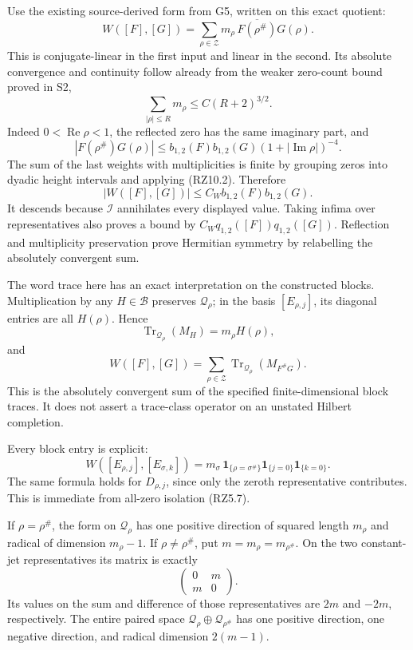 \documentclass[
]{article}
\begin{document}
Use the existing source-derived form from G5, written on this exact
quotient: \[
W([F],[G])
=\sum_{\rho\in\mathscr Z}m_\rho\,
\overline{F(\rho^\#)}G(\rho).
\tag{RZ10.1}
\] This is conjugate-linear in the first input and linear in the second.
Its absolute convergence and continuity follow already from the weaker
zero-count bound proved in S2, \[
\sum_{|\rho|\leq R}m_\rho\leq C(R+2)^{3/2}.
\tag{RZ10.2}
\] Indeed \(0<\operatorname{Re}\rho<1\), the reflected zero has the same
imaginary part, and \[
|F(\rho^\#)G(\rho)|
\leq b_{1,2}(F)b_{1,2}(G)(1+|\operatorname{Im}\rho|)^{-4}.
\] The sum of the last weights with multiplicities is finite by grouping
zeros into dyadic height intervals and applying (RZ10.2). Therefore \[
|W([F],[G])|
\leq C_W b_{1,2}(F)b_{1,2}(G).
\tag{RZ10.3}
\] It descends because \(\mathcal I\) annihilates every displayed value.
Taking infima over representatives also proves a bound by
\(C_Wq_{1,2}([F])q_{1,2}([G])\). Reflection and multiplicity
preservation prove Hermitian symmetry by relabelling the absolutely
convergent sum.

The word trace here has an exact interpretation on the constructed
blocks. Multiplication by any \(H\in\mathcal B\) preserves
\(\mathcal Q_\rho\); in the basis \([E_{\rho,j}]\), its diagonal entries
are all \(H(\rho)\). Hence \[
\operatorname{Tr}_{\mathcal Q_\rho}(M_H)=m_\rho H(\rho),
\tag{RZ10.4}
\] and \[
W([F],[G])
=\sum_{\rho\in\mathscr Z}
\operatorname{Tr}_{\mathcal Q_\rho}(M_{F^\#G}).
\tag{RZ10.5}
\] This is the absolutely convergent sum of the specified
finite-dimensional block traces. It does not assert a trace-class
operator on an unstated Hilbert completion.

Every block entry is explicit: \[
\boxed{\quad
W([E_{\rho,j}],[E_{\sigma,k}])
=m_\sigma\,
\mathbf1_{\{\rho=\sigma^\#\}}
\mathbf1_{\{j=0\}}\mathbf1_{\{k=0\}}.
\quad}
\tag{RZ10.6}
\] The same formula holds for \(D_{\rho,j}\), since only the zeroth
representative contributes. This is immediate from all-zero isolation
(RZ5.7).

If \(\rho=\rho^\#\), the form on \(\mathcal Q_\rho\) has one positive
direction of squared length \(m_\rho\) and radical of dimension
\(m_\rho-1\). If \(\rho\ne\rho^\#\), put \(m=m_\rho=m_{\rho^\#}\). On
the two constant-jet representatives its matrix is exactly \[
\begin{pmatrix}0&m\\m&0\end{pmatrix}.
\tag{RZ10.7}
\] Its values on the sum and difference of those representatives are
\(2m\) and \(-2m\), respectively. The entire paired space
\(\mathcal Q_\rho\oplus\mathcal Q_{\rho^\#}\) has one positive
direction, one negative direction, and radical dimension \(2(m-1)\).
\end{document}
